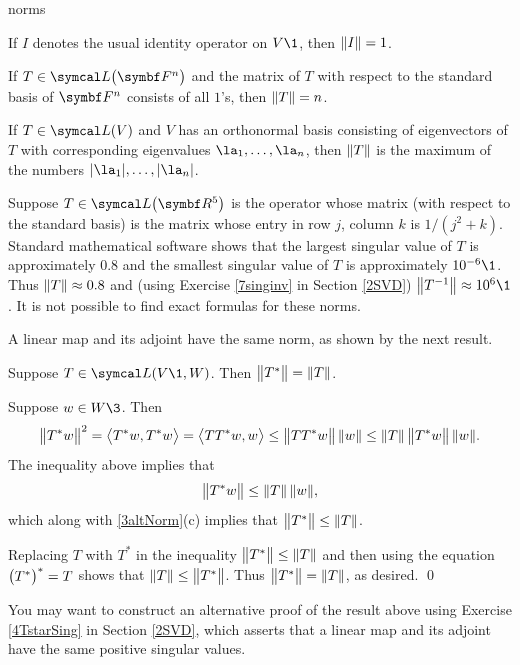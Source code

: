 \begin{example}[5exnorms]{norms}
\vspace{-.10in} %
\begin{Itemize}
\item
If $I$ denotes the usual identity operator on $V\1$, then $\norm{I} = 1$.

\item
If $T \in \L\paren[\big]{\F n}$ and the matrix of $T$ with respect to the standard basis of $\F n$ consists of all $1$'s, then $\norm{T} = n$.

\item
If $T \in \L(V)$ and $V$ has an orthonormal basis consisting of eigenvectors of $T$ with corresponding eigenvalues
$\la_1, \ldots, \la_n$, then $\norm{T}$ is the maximum of the numbers $\abs{\la_1}, \ldots, \abs{\la_n}$.

\item
Suppose $T\in \L\paren[\big]{\R5}$ is the operator whose matrix (with respect to the standard basis) is the  matrix whose entry in row $j$, column $k$ is $1/(j^2 + k)$. Standard mathematical software shows that the largest singular value of $T$ is approximately $0.8$ and the smallest singular value of $T$ is approximately $10^{-6}\1$. Thus $\norm{T} \approx 0.8$ and (using Exercise \ref{7singinv} in Section \ref{2SVD}) $\norm[\big]{T^{-1}} \approx 10^6\1$. It is not possible to find exact formulas for these norms.
\end{Itemize}
\exampleitemend
\end{example}

A linear map and its adjoint have the same norm, as shown by the next result.

{Suppose $T \in \L(V\1, W)$. Then $\norm[\big]{T^*} = \norm{T}$.}

\proof
Suppose $w \in W\3$. Then
\[
\norm[\big]{T^*w}^2 = \ip[\big]{T^*w, T^*w} = \ip[\big]{TT^*w, w} \le \norm[\big]{TT^*w} \, \norm{w} \le \norm{T} \, \norm[\big]{T^*w} \, \norm{w}.
\]
The inequality above implies that
\[
\norm[\big]{T^*w} \le \norm{T} \, \norm{w},
\]
which along with \ref{3altNorm}(c) implies that $\norm[\big]{T^*} \le \norm{T}$.

Replacing $T$ with $T^*$ in the inequality $\norm[\big]{T^*} \le \norm{T}$ and then using the equation $\paren[\big]{T^*}^* = T$ shows that
$\norm{T} \le \norm[\big]{T^*}$. Thus $\norm[\big]{T^*} = \norm{T}$, as desired.
\qed

You may want to construct an alternative proof of the result above using Exercise \ref{4TstarSing} in Section \ref{2SVD}, which asserts that a linear map and its adjoint have the same positive singular values.

